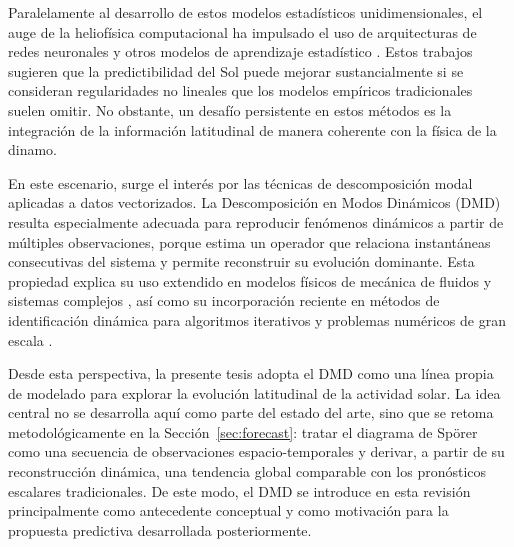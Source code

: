 Paralelamente al desarrollo de estos modelos estadísticos unidimensionales, el auge de la heliofísica computacional ha impulsado el uso de arquitecturas de redes neuronales y otros modelos de aprendizaje estadístico \citep{camporeale2019ml}. Estos trabajos sugieren que la predictibilidad del Sol puede mejorar sustancialmente si se consideran regularidades no lineales que los modelos empíricos tradicionales suelen omitir. No obstante, un desafío persistente en estos métodos es la integración de la información latitudinal de manera coherente con la física de la dinamo.

En este escenario, surge el interés por las técnicas de descomposición modal aplicadas a datos vectorizados. La Descomposición en Modos Dinámicos (DMD) resulta especialmente adecuada para reproducir fenómenos dinámicos a partir de múltiples observaciones, porque estima un operador que relaciona instantáneas consecutivas del sistema y permite reconstruir su evolución dominante. Esta propiedad explica su uso extendido en modelos físicos de mecánica de fluidos y sistemas complejos \citep{schmid2010dmd,kutz2016dmd}, así como su incorporación reciente en métodos de identificación dinámica para algoritmos iterativos y problemas numéricos de gran escala \citep{benitez2026adaptive}.

Desde esta perspectiva, la presente tesis adopta el DMD como una línea propia de modelado para explorar la evolución latitudinal de la actividad solar. La idea central no se desarrolla aquí como parte del estado del arte, sino que se retoma metodológicamente en la Sección~\ref{sec:forecast}: tratar el diagrama de Spörer como una secuencia de observaciones espacio-temporales y derivar, a partir de su reconstrucción dinámica, una tendencia global comparable con los pronósticos escalares tradicionales. De este modo, el DMD se introduce en esta revisión principalmente como antecedente conceptual y como motivación para la propuesta predictiva desarrollada posteriormente.